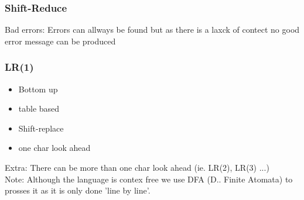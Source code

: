 \documentclass[11pt,twoside,a4paper]{article}
\begin{document}
      \subsubsection{Shift-Reduce}
        Bad errors: Errors can allways be found but as there is a laxck of contect no good error message can be produced
      
      \subsubsection{LR(1)}
        \begin{itemize}
          \item Bottom up
          \item table based
          \item Shift-replace
          \item one char look ahead
        \end{itemize}
        Extra: There can be more than one char look ahead (ie. LR(2), LR(3) ...) \\
        Note: Although the language is contex free we use DFA (D.. Finite Atomata) to prosses it as it is only done 'line by line'.
  
  \clearpage  
  
  
\end{document}

